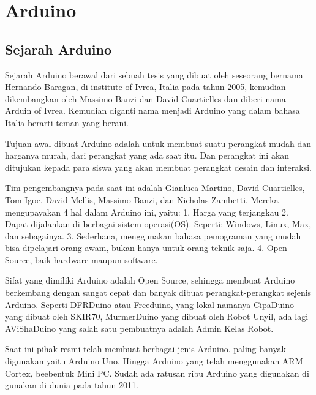 \section{Arduino}
\subsection{Sejarah Arduino}
	Sejarah Arduino berawal dari sebuah tesis yang dibuat oleh seseorang bernama Hernando Baragan, di institute of Ivrea, Italia pada tahun 2005, kemudian dikembangkan oleh Massimo Banzi dan David Cuartielles dan diberi nama Arduin of Ivrea. Kemudian diganti nama menjadi Arduino yang dalam bahasa Italia berarti teman yang berani.

	Tujuan awal dibuat Arduino adalah untuk membuat suatu perangkat mudah dan harganya murah, dari perangkat yang ada saat itu. Dan perangkat ini akan ditujukan kepada para siswa yang akan membuat perangkat desain dan interaksi.

	Tim pengembangnya pada saat ini adalah Gianluca Martino, David Cuartielles, Tom Igoe, David Mellis, Massimo Banzi, dan Nicholas Zambetti. Mereka mengupayakan 4 hal dalam Arduino ini, yaitu:
	1.	Harga yang terjangkau
	2.	Dapat dijalankan di berbagai sistem operasi(OS). Seperti: Windows, Linux, Max, dan sebagainya.
	3.	Sederhana, menggunakan bahasa pemograman yang mudah bisa dipelajari orang awam, bukan hanya untuk orang teknik saja.
	4.	Open Source, baik hardware maupun software.

	Sifat yang dimiliki Arduino adalah Open Source, sehingga membuat Arduino berkembang dengan sangat cepat dan banyak dibuat perangkat-perangkat sejenis Arduino. Seperti DFRDuino atau Freeduino,  yang lokal namanya CipaDuino yang dibuat oleh SKIR70, MurmerDuino yang dibuat oleh Robot Unyil, ada lagi AViShaDuino yang salah satu pembuatnya adalah Admin Kelas Robot.
	
	Saat ini pihak resmi telah membuat berbagai jenis Arduino.  paling banyak digunakan yaitu Arduino Uno, Hingga Arduino yang telah menggunakan ARM Cortex, beebentuk Mini PC. Sudah ada ratusan ribu Arduino yang digunakan di gunakan di dunia pada tahun 2011. 
